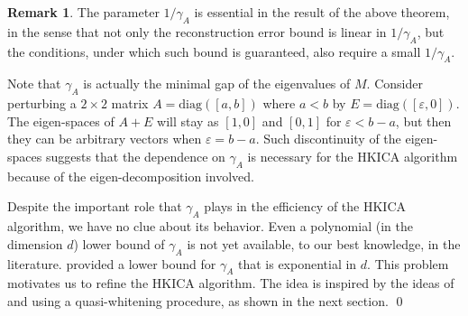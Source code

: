 \documentclass[twoside]{article}
\theoremstyle{definition}
\newtheorem{remark}[lemma]{Remark}
\newcommand{\eps}{\varepsilon}
\begin{document}
\begin{remark}
The parameter $1/\gamma_A$ is essential in the result of the above theorem, in the sense that not only the reconstruction error bound is linear in $1/\gamma_A$, but the conditions, under which such bound is guaranteed, also require a small $1/\gamma_A$.

Note that $\gamma_A$ is actually the minimal gap of the eigenvalues of $M$.
Consider perturbing a $2\times 2$ matrix $A = \text{diag}([a,b])$ where $a<b$ by $E = \text{diag}([\eps,0])$. 
The eigen-spaces of $A+E$ will stay as $[1,0]$ and $[0,1]$ for $\eps < b-a$, but then they can be arbitrary vectors when $\eps = b-a$.  
Such discontinuity of the eigen-spaces suggests that the dependence on $\gamma_A$ is necessary for the HKICA algorithm because of the eigen-decomposition involved. 

Despite the important role that $\gamma_A$ plays in the efficiency of the HKICA algorithm, we have no clue about its behavior. 
Even a polynomial (in the dimension $d$) lower bound of $\gamma_A$ is not yet available, to our best knowledge, in the literature. 
\citet{goyal2014fourier} provided a lower bound for $\gamma_A$ that is exponential in $d$.
This problem motivates us to refine the HKICA algorithm.
The idea is inspired by the ideas of \citet{arora2012provable} and \citet{frieze1996learning} using a quasi-whitening procedure, as shown in the next section. \qed
\end{remark}
\end{document}

